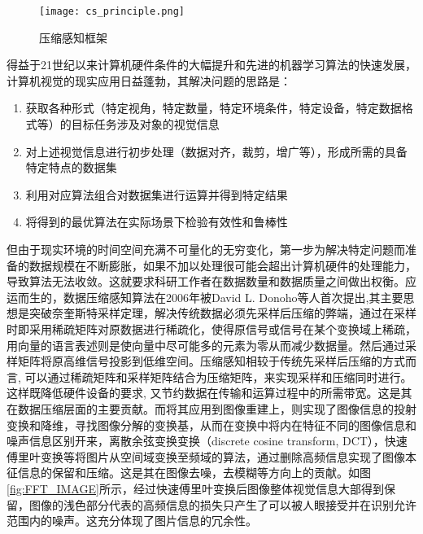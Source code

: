 \begin{figure}[ht]
  \centering
  \texttt{[image: cs\_principle.png]}
  \caption{压缩感知框架}

\end{figure}
得益于21世纪以来计算机硬件条件的大幅提升和先进的机器学习算法的快速发展，计算机视觉的现实应用日益蓬勃，其解决问题的思路是：
\begin{enumerate}
  \item 获取各种形式（特定视角，特定数量，特定环境条件，特定设备，特定数据格式等）的目标任务涉及对象的视觉信息
  \item 对上述视觉信息进行初步处理（数据对齐，裁剪，增广等），形成所需的具备特定特点的数据集
  \item 利用对应算法组合对数据集进行运算并得到特定结果
  \item 将得到的最优算法在实际场景下检验有效性和鲁棒性
\end{enumerate}


但由于现实环境的时间空间充满不可量化的无穷变化，第一步为解决特定问题而准备的数据规模在不断膨胀，如果不加以处理很可能会超出计算机硬件的处理能力，导致算法无法收敛。这就要求科研工作者在数据数量和数据质量之间做出权衡。应运而生的，数据压缩感知算法在2006年被David L. Donoho等人首次提出\citep{David_compress,An_Introduction_To_Compressive_Sampling,Extensions_of_compressed_sensing},其主要思想是突破奈奎斯特采样定理，解决传统数据必须先采样后压缩的弊端，通过在采样时即采用稀疏矩阵对原数据进行稀疏化，使得原信号或信号在某个变换域上稀疏，用向量的语言表述则是使向量中尽可能多的元素为零从而减少数据量。然后通过采样矩阵将原高维信号投影到低维空间。压缩感知相较于传统先采样后压缩的方式而言, 可以通过稀疏矩阵和采样矩阵结合为压缩矩阵，来实现采样和压缩同时进行。这样既降低硬件设备的要求, 又节约数据在传输和运算过程中的所需带宽。这是其在数据压缩层面的主要贡献。而将其应用到图像重建上，则实现了图像信息的投射变换和降维，寻找图像分解的变换基，从而在变换中将内在特征不同的图像信息和噪声信息区别开来，离散余弦变换变换（discrete cosine transform, DCT）\cite{DCT}，快速傅里叶变换等将图片从空间域变换至频域的算法，通过删除高频信息实现了图像本征信息的保留和压缩。这是其在图像去噪，去模糊等方向上的贡献。如图\ref{fig:FFT_IMAGE}所示，经过快速傅里叶变换后图像整体视觉信息大部得到保留，图像的浅色部分代表的高频信息的损失只产生了可以被人眼接受并在识别允许范围内的噪声。这充分体现了图片信息的冗余性。


